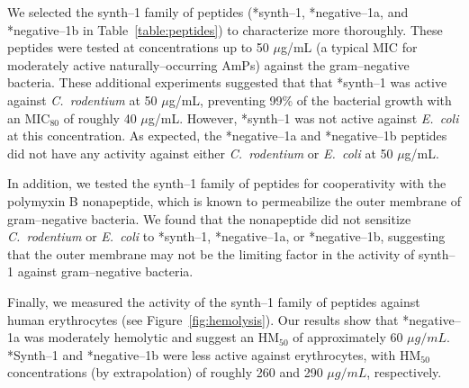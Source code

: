     We selected the synth--1 family of peptides (*synth--1, *negative--1a,
    and *negative--1b in Table~\ref{table:peptides}) to characterize
    more thoroughly.  These peptides were tested at concentrations up to
    50 $\mu$g/mL (a typical MIC for moderately active naturally--occurring
    AmPs) against the gram--negative bacteria.  These additional experiments
    suggested that that *synth--1 was
    active against \emph{C.\ rodentium} at 50 $\mu$g/mL, preventing 99\%
    of the bacterial growth with an MIC$_{80}$ of roughly 40 $\mu$g/mL.
    However, *synth--1 was not active against \emph{E.\ coli} at this
    concentration.  As expected, the *negative--1a and *negative--1b
    peptides did not have any activity against either \emph{C.\ rodentium}
    or \emph{E.\ coli} at 50 $\mu$g/mL.

    In addition, we tested the synth--1 family of peptides for
    cooperativity with the polymyxin B nonapeptide, which is known
    to permeabilize the outer membrane of gram--negative bacteria.
    We found that the nonapeptide did not sensitize \emph{C.\ rodentium}
    or \emph{E.\ coli} to *synth--1, *negative--1a, or *negative--1b,
    suggesting that the outer membrane may not be the limiting factor
    in the activity of synth--1 against gram--negative bacteria.

    Finally, we measured the activity of the synth--1 family of peptides
    against human erythrocytes (see Figure~\vref{fig:hemolysis}).  Our results show that
    *negative--1a was moderately hemolytic and suggest an HM$_{50}$
    of approximately 60 $\mu g/mL$.  *Synth--1 and *negative--1b were
    less active against erythrocytes, with HM$_{50}$ concentrations
    (by extrapolation) of roughly 260 and 290 $\mu g/mL$, respectively.




